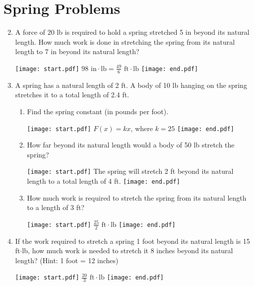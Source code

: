 \documentclass[12pt]{article}
\begin{document}
\section*{Spring Problems}

\begin{enumerate}
\setcounter{enumi}{1}

\item A force of 20 lb is required to hold a spring stretched 5 in beyond its natural length.  How much work is done in stretching the spring from its natural length to 7 in beyond its natural length?

\texttt{[image: start.pdf]}
{{$98 \text{ in}\cdot\text{lb}=\frac{49}{6} \text{ ft}\cdot\text{lb}$ }}
\texttt{[image: end.pdf]}


\newpage

\item A spring has a natural length of 2 ft.  A body of 10 lb hanging on the spring stretches it to a total length of 2.4 ft.

\begin{enumerate}

\item Find the spring constant (in pounds per foot).

\texttt{[image: start.pdf]}
{{$F(x)=kx$, where $k=25$}}
\texttt{[image: end.pdf]}


\item  How far beyond its natural length would a body of 50 lb stretch the spring?

\texttt{[image: start.pdf]}
{{The spring will stretch 2 ft beyond its natural length to a total length of 4 ft.}}
\texttt{[image: end.pdf]}


\item How much work is required to stretch the spring from its natural length to a length of 3 ft?

\texttt{[image: start.pdf]}
{{$\frac{25}{2} \text{ ft}\cdot\text{lb}$}}
\texttt{[image: end.pdf]}


\end{enumerate}

\item If the work required to stretch a spring 1 foot beyond its natural length is 15 ft$\cdot$lb, how much work is needed to stretch it 8 inches beyond its natural length? (Hint: 1 foot = 12 inches)

\texttt{[image: start.pdf]}
{{$\frac{20}{3} \text{ ft}\cdot\text{lb}$}}
\texttt{[image: end.pdf]}


\end{enumerate}
\end{document}
